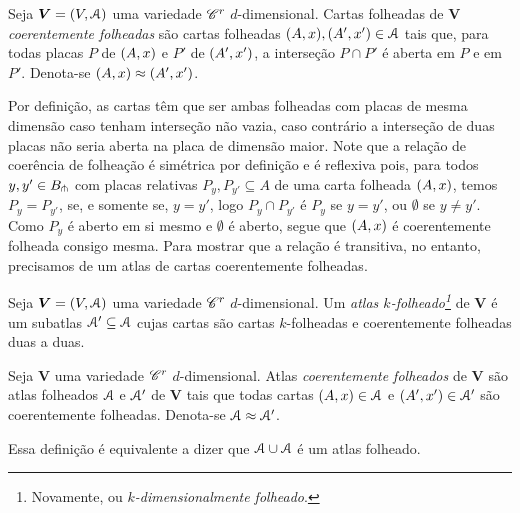 \begin{definition}
Seja $\bm V = (V,\mathcal{A})$ uma variedade $\mathscr{C}^r$ $d$-dimensional. Cartas folheadas de $\bm V$ \emph{coerentemente folheadas} são cartas folheadas $(A,x), (A',x') \in \mathcal{A}$ tais que, para todas placas $P$ de $(A,x)$ e $P'$ de $(A',x')$, a interseção $P \cap P'$ é aberta em $P$ e em $P'$. Denota-se $(A,x) \approx (A',x')$.
\end{definition}

Por definição, as cartas têm que ser ambas folheadas com placas de mesma dimensão caso tenham interseção não vazia, caso contrário a interseção de duas placas não seria aberta na placa de dimensão maior. Note que a relação de coerência de folheação é simétrica por definição e é reflexiva pois, para todos $y,y' \in B_{\pitchfork}$ com placas relativas $P_y,P_{y'} \subseteq A$ de uma carta folheada $(A,x)$, temos $P_y = P_{y'}$, se, e somente se, $y=y'$, logo $P_y \cap P_{y'}$ é $P_y$ se $y=y'$, ou $\emptyset$ se $y \neq y'$. Como $P_y$ é aberto em si mesmo e $\emptyset$ é aberto, segue que $(A,x)$ é coerentemente folheada consigo mesma. Para mostrar que a relação é transitiva, no entanto, precisamos de um atlas de cartas coerentemente folheadas. 

\begin{definition}
Seja $\bm V = (V,\mathcal{A})$ uma variedade $\mathscr{C}^r$ $d$-dimensional. Um \emph{atlas $k$-folheado\footnote{Novamente, ou \emph{$k$-dimensionalmente folheado}.}} de $\bm V$ é um subatlas $\mathcal{A}' \subseteq \mathcal{A}$ cujas cartas são cartas $k$-folheadas e coerentemente folheadas duas a duas.
\end{definition}

\begin{definition}
Seja $\bm V$ uma variedade $\mathscr{C}^r$ $d$-dimensional. Atlas \emph{coerentemente folheados} de $\bm V$ são atlas folheados $\mathcal{A}$ e $\mathcal{A}'$ de $\bm V$ tais que todas cartas $(A,x) \in \mathcal{A}$ e $(A',x') \in \mathcal{A}'$ são coerentemente folheadas. Denota-se $\mathcal{A} \approx \mathcal{A}'$.
\end{definition}

Essa definição é equivalente a dizer que $\mathcal{A} \cup \mathcal{A}$ é um atlas folheado.

